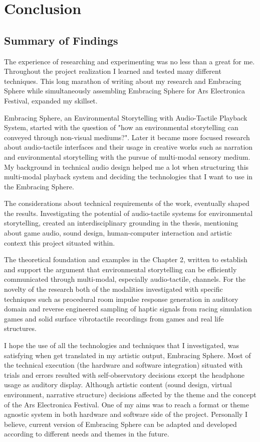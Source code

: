 \chapter{Conclusion}
    \section{Summary of Findings}
        The experience of researching and experimenting was no less than a great for me. Throughout the project realization I learned and tested many different techniques. This long marathon of writing about my research and Embracing Sphere while simultaneously assembling Embracing Sphere for Ars Electronica Festival, expanded my skillset.\par

        Embracing Sphere, an Environmental Storytelling with Audio-Tactile Playback System, started with the question of "how an environmental storytelling can conveyed through non-visual mediums?". Later it became more focused research about audio-tactile interfaces and their usage in creative works such as narration and environmental storytelling with the pursue of multi-modal sensory medium. My background in technical audio design helped me a lot when structuring this multi-modal playback system and deciding the technologies that I want to use in the Embracing Sphere.\par

        The considerations about technical requirements of the work, eventually shaped the results. Investigating the potential of audio-tactile systems for environmental storytelling, created an interdisciplinary grounding in the thesis, mentioning about game audio, sound design, human-computer interaction and artistic context this project situated within.\par

        The theoretical foundation and examples in the Chapter 2, written to establish and support the argument that environmental storytelling can be efficiently communicated through multi-modal, especially audio-tactile, channels. For the novelty of the research both of the modalities investigated with specific techniques such as procedural room impulse response generation in auditory domain and reverse engineered sampling of haptic signals from racing simulation games and solid surface vibrotactile recordings from games and real life structures.\par

        I hope the use of all the technologies and techniques that I investigated, was satisfying when get translated in my artistic output, Embracing Sphere. Most of the technical execution (the hardware and software integration) situated with trials and errors resulted with self-observatory decisions except the headphone usage as auditory display. Although artistic content (sound design, virtual environment, narrative structure) decisions affected by the theme and the concept of the Ars Electronica Festival. One of my aims was to reach a format or theme agnostic system in both hardware and software side of the project. Personally I believe, current version of Embracing Sphere can be adapted and developed according to different needs and themes in the future.\par
